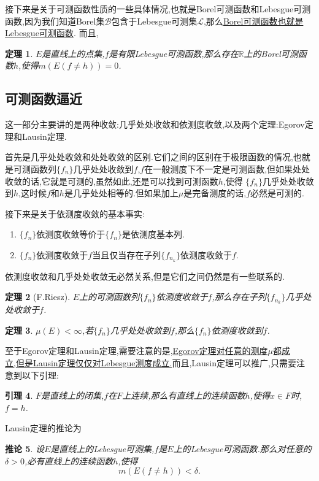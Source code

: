 \documentclass[12pt,a4paper,oneside]{ctexart}
\theoremstyle{nonumberplain}
\theoremstyle{plain}
\newtheorem{theorem}{定理}[section]
\theoremstyle{plain}
\newtheorem{lemma}[theorem]{引理}
\theoremstyle{nonumberplain}
\theoremstyle{plain}
\theoremstyle{plain}
\theoremstyle{plain}
\theoremstyle{plain}
\newtheorem{corollary}[theorem]{推论}
\newcommand{\R}{\mathbb{R}}
\newcommand{\cB}{\mathcal{B}}
\newcommand{\cL}{\mathcal{L}}
\begin{document}
    接下来是关于可测函数性质的一些具体情况,也就是Borel可测函数和Lebesgue可测函数,因为我们知道Borel集$\cB$包含于Lebesgue可测集$\cL$,那么\underline{Borel可测函数也就是}\\\underline{Lebesgue可测函数}.
    而且,
    \begin{theorem}
        $E$是直线上的点集,$f$是有限Lebesgue可测函数,那么存在$\R$上的Borel可测函数$h$,使得$m(E(f\neq h))=0$.
    \end{theorem}

    \subsection{可测函数逼近}

    这一部分主要讲的是两种收敛:几乎处处收敛和依测度收敛,以及两个定理:Egorov定理和Lausin定理.

    首先是几乎处处收敛和处处收敛的区别.它们之间的区别在于极限函数的情况,也就是可测函数列$\{f_n\}$几乎处处收敛到$f$,$f$在一般测度下不一定是可测函数,但如果处处收敛的话,它就是可测的,虽然如此,还是可以找到可测函数$h$,使得
    $\{f_n\}$几乎处处收敛到$h$,这时候$f$和$h$是几乎处处相等的.但如果加上$\mu$是完备测度的话,$f$必然是可测的.

    接下来是关于依测度收敛的基本事实:
    \begin{enumerate}
        \item $\{f_n\}$依测度收敛等价于$\{f_n\}$是依测度基本列.
        \item $\{f_n\}$依测度收敛于$f$当且仅当存在子列$\{f_{n_k}\}$依测度收敛于$f$.
    \end{enumerate}

    依测度收敛和几乎处处收敛无必然关系,但是它们之间仍然是有一些联系的.
    \begin{theorem}[F.Riesz]
        $E$上的可测函数列$\{f_n\}$依测度收敛于$f$,那么存在子列$\{f_{n_k}\}$几乎处处收敛于$f$.
    \end{theorem}

    \begin{theorem}
        $\mu(E)<\infty$,若$\{f_n\}$几乎处处收敛到$f$,那么$\{f_n\}$依测度收敛到$f$.
    \end{theorem}

    至于Egorov定理和Lausin定理,需要注意的是,\underline{Egorov定理对任意的测度$\mu$都成}\\\underline{立,但是Lausin定理仅仅对Lebesgue测度成立.}而且,Lausin定理可以推广,只需要注\\意到以下引理:

    \begin{lemma}
        \label{lem:一维连续延拓}
        $F$是直线上的闭集,$f$在$F$上连续,那么有直线上的连续函数$h$,使得$x\in F$时,$f=h$.
    \end{lemma}
    Lausin定理的推论为
    \begin{corollary}
        设$E$是直线上的Lebesgue可测集,$f$是$E$上的Lebesgue可测函数.那么对任意的$\delta>0$,必有直线上的连续函数$h$,使得 
        \begin{equation*}
            m(E(f\neq h))<\delta.
        \end{equation*}
    \end{corollary}
\end{document}
